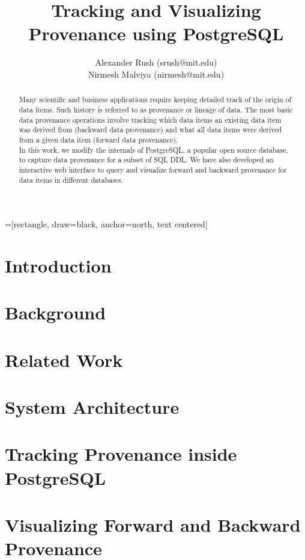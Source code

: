 \documentclass[11pt]{article}
\title{Tracking and Visualizing Provenance using PostgreSQL}
\author{Alexander Rush (srush@mit.edu)\\ Nirmesh Malviya (nirmesh@mit.edu)}
\begin{document}
=[rectangle, draw=black, anchor=north, text centered]
\maketitle

\begin{abstract}
Many scientific and business applications require keeping detailed track of the origin of data items. Such history is referred to as provenance or lineage of data. The most basic data provenance operations involve tracking which data items an existing data item was derived from (backward data provenance) and what all data items were derived from a given data item (forward data provenance). \\

In this work, we modify the internals of PostgreSQL, a popular open source database, to capture data provenance for a subset of SQL DDL. We have also developed an interactive web interface to query and visualize forward and backward provenance for data items in different databases.
\end{abstract}

\section{Introduction}


\section{Background}


\section{Related Work}


\section{System Architecture}




\section{Tracking Provenance inside PostgreSQL}




\section{Visualizing Forward and Backward Provenance}
\end{document}
